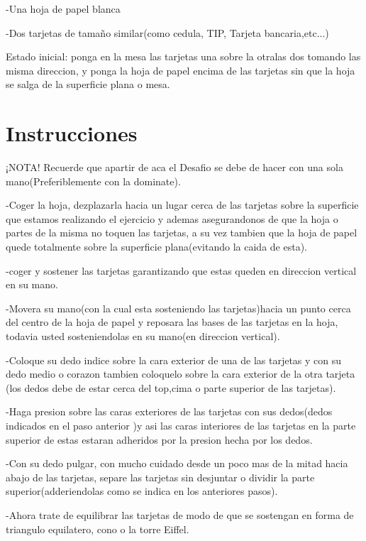 \documentclass{article}
\begin{document}
    -Una hoja de papel blanca
    
    -Dos tarjetas de tamaño similar(como cedula, TIP, Tarjeta bancaria,etc...)
    
    Estado inicial: ponga en la mesa las tarjetas una sobre la otralas dos tomando las misma direccion, y ponga la hoja de papel encima de las tarjetas sin que la hoja se salga de la superficie plana o mesa.

\section{Instrucciones} \label{contenido}
    ¡NOTA! Recuerde que apartir de aca el Desafio se debe de hacer con una sola mano(Preferiblemente con la dominate).
    
    
    -Coger la hoja, dezplazarla hacia un lugar cerca de las tarjetas sobre la superficie que estamos realizando el ejercicio y ademas asegurandonos de que la hoja o partes de la misma no toquen las tarjetas, a su vez tambien que la hoja de papel quede totalmente sobre la superficie plana(evitando la caida de esta).

    
    -coger y sostener las tarjetas garantizando que estas queden en direccion vertical en su mano.

    
    -Movera su mano(con la cual esta sosteniendo las tarjetas)hacia un punto cerca del centro de la hoja de papel  y reposara las bases de las tarjetas en la hoja, todavia    usted sosteniendolas en su mano(en direccion vertical).
 
    
    -Coloque su dedo indice sobre la cara exterior de una de las tarjetas y con su dedo medio o corazon tambien coloquelo sobre la cara exterior de la otra tarjeta (los dedos debe de estar cerca del top,cima  o parte superior de las tarjetas).

    
    -Haga presion sobre las caras exteriores de las tarjetas  con sus dedos(dedos indicados en el paso anterior )y asi las caras interiores de las tarjetas en la parte superior de estas estaran adheridos por la presion hecha por los dedos.
   
    
    -Con su dedo pulgar, con mucho cuidado desde un poco mas de la mitad hacia abajo de las tarjetas, separe las tarjetas sin desjuntar o dividir la parte superior(adderiendolas como se indica en los anteriores pasos).
    
    
    -Ahora    trate de equilibrar las tarjetas de modo de que se sostengan en forma de triangulo equilatero, cono o la torre Eiffel.
\end{document}
